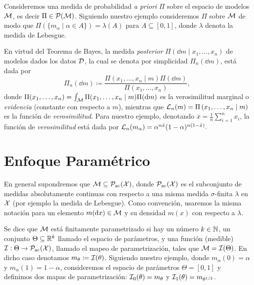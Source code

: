 Consideremos una medida de probabilidad \emph{a priori} \(\Pi\) sobre el espacio de modelos \(\mathcal{M}\), es decir \(\Pi \in \mathcal{P}(\mathcal{M})\). Siguiendo nuestro ejemplo consideremos \(\Pi\) sobre \(\mathcal{M}\) de modo que \(\Pi(\{m_\alpha \mid \alpha \in A\}) = \lambda(A)\) para \(A \subseteq [0,1]\), donde \(\lambda\) denota la medida de Lebesgue. 


En virtud del Teorema de Bayes, la medida \emph{posterior} \(\Pi(\dd{m} \mid x_1, \dotsc, x_n)\) de modelos dados los datos \(\mathcal{D}\), la cual se denota por simplicidad \(\Pi_n(\dd{m})\), está dada por
\begin{equation}\label{eq def Pi n}
	\Pi_n(\dd{m}) \coloneqq \frac{\Pi \left(x_1, \dotsc, x_n \mid m\right) \Pi \left(\dd{m}\right)}{\Pi \left(x_1, \dotsc, x_n\right)},
\end{equation}
donde \(\Pi(x_1, \dotsc, x_n) = \int_{\mathcal{M}} \Pi(x_1, \dotsc, x_n \mid m) \Pi(\dd{m})\) es la verosimilitud marginal o \emph{evidencia} (constante con respecto a \(m\)), mientras que \(\mathcal{L}_n(m) = \Pi  \left(x_1, \dotsc, x_n \mid m\right)\) es la función de \emph{verosimilitud}. Para nuestro ejemplo, denotando \(\bar{x} = \frac{1}{n}\sum_{i=1}^n x_i\), la función de \emph{verosimilitud} está dada por \(\mathcal{L}_n(m_\alpha) = \alpha^{n \bar{x}} (1-\alpha)^{n (1-\bar{x})}.\)




\section{Enfoque Paramétrico}

En general supondremos que \(\mathcal{M} \subseteq \mathcal{P}_{\mathrm{ac}}(\mathcal{X})\), donde \(\mathcal{P}_{\mathrm{ac}}(\mathcal{X})\) es el subconjunto de medidas absolutamente continuas con respecto a una misma medida \(\sigma\)-finita \(\lambda\) en \(\mathcal{X}\) (por ejemplo la medida de Lebesgue). Como convención, usaremos la misma notación para un elemento \(m(\dd{x}) \in \mathcal{M}\) y su densidad \(m(x)\) con respecto a \(\lambda\). 

Se dice que \(\mathcal{M}\) está finitamente parametrizado si hay un número \(k \in \mathbb{N}\), un conjunto \(\Theta \subseteq \mathbb{R}^k\) llamado el espacio de parámetros, y una función (medible) \(\mathcal{I} : \Theta \to \mathcal{P}_{\mathrm{ac}}(\mathcal{X})\), llamado el mapeo de parametrización, tales que \(\mathcal{M} = \mathcal{I}(\Theta)\). En dicho caso denotamos \(m_\theta \coloneqq \mathcal{I}(\theta)\). Siguiendo nuestro ejemplo, donde \(m_\alpha({0}) = \alpha\) y \(m_\alpha({1}) = 1-\alpha\), consideremos el espacio de parámetros \(\Theta = [0,1]\) y definimos dos mapas de parametrización: \(\mathcal{I}_0(\theta) = m_\theta\) y \(\mathcal{I}_1(\theta) = m_{\theta^{1/2}}\).

